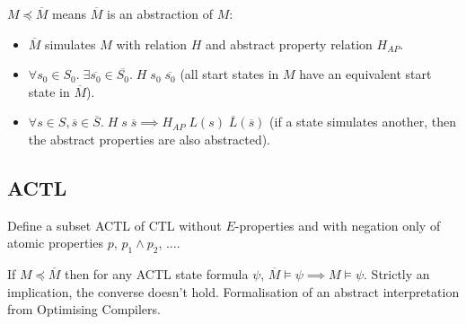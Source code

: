 \documentclass[a4paper, 11pt]{article}
\begin{document}
{{        \(M \preceq \overline{M}\) means \(\overline{M}\) is an abstraction of \(M\):
        \begin{itemize}
        \item \(\overline{M}\) simulates \(M\) with relation \(H\) and abstract property relation \(H_{AP}\).
        \item \(\forall s_0\in S_0.\;\exists \overline{s_0} \in \overline{S_0}.\;H\;s_0\;\overline{s_0}\) (all start states in \(M\) have an equivalent start state in \(\overline{M}\)).
        \item \(\forall s \in S, \overline{s} \in \overline{S}.\;H\;s\;\overline{s} \implies H_{AP}\;L(s)\;\overline{L}(\overline{s})\) (if a state simulates another, then the abstract properties are also abstracted).
        \end{itemize}
    }
    \subsection*{ACTL}
    {
        Define a subset ACTL of CTL without \(E\)-properties and with negation only of atomic properties \(p\), \(p_1 \wedge p_2\), ....

        If \(M \preceq \overline{M}\) then for any ACTL state formula \(\psi\), \(\overline{M} \vDash \psi \implies M \vDash \psi\). Strictly an implication, the converse doesn't hold. Formalisation of an abstract interpretation from Optimising Compilers.
    }
}
\end{document}
